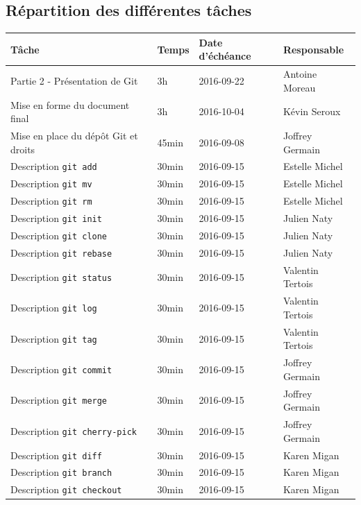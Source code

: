 \documentclass[11pt,canadien]{article}
\begin{document}
\newpage
\begin{appendices} %

\section{Répartition des différentes tâches}
\begin{tabular}{l l l l}
	\textbf{Tâche} & \textbf{Temps} & \textbf{Date d'échéance} & \textbf{Responsable}
	\\ \hline
	   Partie 2 - Présentation de Git       & 3h    & 2016-09-22 & Antoine Moreau
	\\ Mise en forme du document final      & 3h    & 2016-10-04 & Kévin Seroux
	\\ Mise en place du dépôt Git et droits & 45min & 2016-09-08 & Joffrey Germain
	\\ Description \texttt{git add}         & 30min & 2016-09-15 & Estelle Michel
	\\ Description \texttt{git mv}          & 30min & 2016-09-15 & Estelle Michel
	\\ Description \texttt{git rm}          & 30min & 2016-09-15 & Estelle Michel
	\\ Description \texttt{git init}        & 30min & 2016-09-15 & Julien Naty
	\\ Description \texttt{git clone}       & 30min & 2016-09-15 & Julien Naty
	\\ Description \texttt{git rebase}      & 30min & 2016-09-15 & Julien Naty
	\\ Description \texttt{git status}      & 30min & 2016-09-15 & Valentin Tertois
	\\ Description \texttt{git log}         & 30min & 2016-09-15 & Valentin Tertois
	\\ Description \texttt{git tag}         & 30min & 2016-09-15 & Valentin Tertois
	\\ Description \texttt{git commit}      & 30min & 2016-09-15 & Joffrey Germain
	\\ Description \texttt{git merge}       & 30min & 2016-09-15 & Joffrey Germain
	\\ Description \texttt{git cherry-pick} & 30min & 2016-09-15 & Joffrey Germain
	\\ Description \texttt{git diff}        & 30min & 2016-09-15 & Karen Migan
	\\ Description \texttt{git branch}      & 30min & 2016-09-15 & Karen Migan
	\\ Description \texttt{git checkout}    & 30min & 2016-09-15 & Karen Migan

\end{tabular}
\end{appendices}
\end{document}
